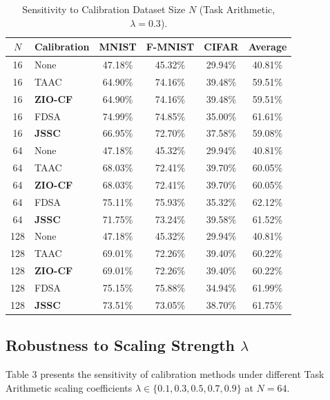 \documentclass{article}
\begin{document}
\begin{table}[tb]
\centering
\caption{Sensitivity to Calibration Dataset Size $N$ (Task Arithmetic, $\lambda=0.3$).}
\label{tab:sample_efficiency}
\vskip 0.1in
\begin{tabular}{clcccc}
\toprule
\textbf{$N$} & \textbf{Calibration} & \textbf{MNIST} & \textbf{F-MNIST} & \textbf{CIFAR} & \textbf{Average} \\
\midrule
16 & None & 47.18\% & 45.32\% & 29.94\% & 40.81\% \\
16 & TAAC & 64.90\% & 74.16\% & 39.48\% & 59.51\% \\
16 & \textbf{ZIO-CF} & 64.90\% & 74.16\% & 39.48\% & 59.51\% \\
16 & FDSA & 74.99\% & 74.85\% & 35.00\% & 61.61\% \\
16 & \textbf{JSSC} & 66.95\% & 72.70\% & 37.58\% & 59.08\% \\
\hline
64 & None & 47.18\% & 45.32\% & 29.94\% & 40.81\% \\
64 & TAAC & 68.03\% & 72.41\% & 39.70\% & 60.05\% \\
64 & \textbf{ZIO-CF} & 68.03\% & 72.41\% & 39.70\% & 60.05\% \\
64 & FDSA & 75.11\% & 75.93\% & 35.32\% & 62.12\% \\
64 & \textbf{JSSC} & 71.75\% & 73.24\% & 39.58\% & 61.52\% \\
\hline
128 & None & 47.18\% & 45.32\% & 29.94\% & 40.81\% \\
128 & TAAC & 69.01\% & 72.26\% & 39.40\% & 60.22\% \\
128 & \textbf{ZIO-CF} & 69.01\% & 72.26\% & 39.40\% & 60.22\% \\
128 & FDSA & 75.15\% & 75.88\% & 34.94\% & 61.99\% \\
128 & \textbf{JSSC} & 73.51\% & 73.05\% & 38.70\% & 61.75\% \\
\bottomrule
\end{tabular}
\end{table}

\subsection{Robustness to Scaling Strength $\lambda$}
Table 3 presents the sensitivity of calibration methods under different Task Arithmetic scaling coefficients $\lambda \in \{0.1, 0.3, 0.5, 0.7, 0.9\}$ at $N=64$.
\end{document}
